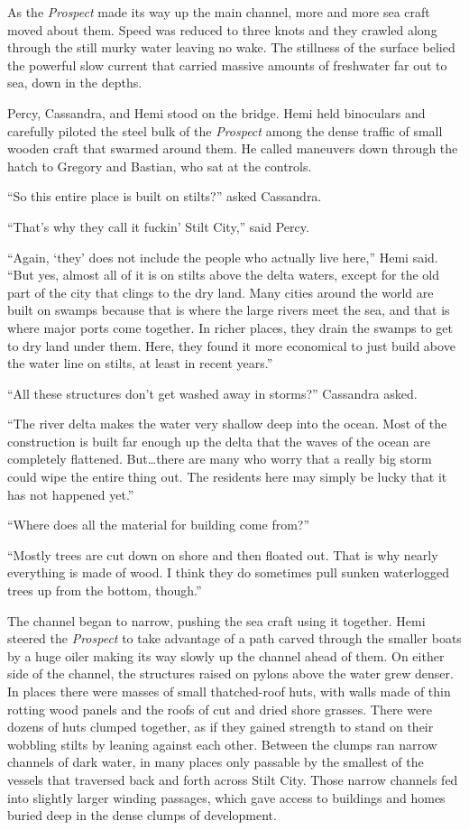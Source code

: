 \documentclass[
]{scrbook}
\begin{document}
As the \emph{Prospect} made its way up the main channel, more and more
sea craft moved about them. Speed was reduced to three knots and they
crawled along through the still murky water leaving no wake. The
stillness of the surface belied the powerful slow current that carried
massive amounts of freshwater far out to sea, down in the depths.

Percy, Cassandra, and Hemi stood on the bridge. Hemi held binoculars and
carefully piloted the steel bulk of the \emph{Prospect} among the dense
traffic of small wooden craft that swarmed around them. He called
maneuvers down through the hatch to Gregory and Bastian, who sat at the
controls.

``So this entire place is built on stilts?'' asked Cassandra.

``That's why they call it fuckin' Stilt City,'' said Percy.

``Again, `they' does not include the people who actually live here,''
Hemi said. ``But yes, almost all of it is on stilts above the delta
waters, except for the old part of the city that clings to the dry land.
Many cities around the world are built on swamps because that is where
the large rivers meet the sea, and that is where major ports come
together. In richer places, they drain the swamps to get to dry land
under them. Here, they found it more economical to just build above the
water line on stilts, at least in recent years.''

``All these structures don't get washed away in storms?'' Cassandra
asked.

``The river delta makes the water very shallow deep into the ocean. Most
of the construction is built far enough up the delta that the waves of
the ocean are completely flattened. But\ldots there are many who worry
that a really big storm could wipe the entire thing out. The residents
here may simply be lucky that it has not happened yet.''

``Where does all the material for building come from?''

``Mostly trees are cut down on shore and then floated out. That is why
nearly everything is made of wood. I think they do sometimes pull sunken
waterlogged trees up from the bottom, though.''

The channel began to narrow, pushing the sea craft using it together.
Hemi steered the \emph{Prospect} to take advantage of a path carved
through the smaller boats by a huge oiler making its way slowly up the
channel ahead of them. On either side of the channel, the structures
raised on pylons above the water grew denser. In places there were
masses of small thatched-roof huts, with walls made of thin rotting wood
panels and the roofs of cut and dried shore grasses. There were dozens
of huts clumped together, as if they gained strength to stand on their
wobbling stilts by leaning against each other. Between the clumps ran
narrow channels of dark water, in many places only passable by the
smallest of the vessels that traversed back and forth across Stilt City.
Those narrow channels fed into slightly larger winding passages, which
gave access to buildings and homes buried deep in the dense clumps of
development.
\end{document}
